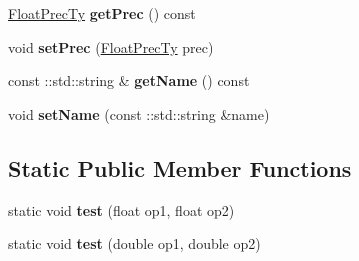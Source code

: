 \begin{DoxyCompactItemize}
\hyperlink{structfap_1_1FloatPrecTy}{Float\+Prec\+Ty} {\bfseries get\+Prec} () const
\item 
\hypertarget{classfap_1_1FloatingPointType_aad298748c031668ce198d5afefd81124}{}\label{classfap_1_1FloatingPointType_aad298748c031668ce198d5afefd81124} 
void {\bfseries set\+Prec} (\hyperlink{structfap_1_1FloatPrecTy}{Float\+Prec\+Ty} prec)
\item 
\hypertarget{classfap_1_1FloatingPointType_a086c6c9c7141b3b7e96e1cb2f4a9dacc}{}\label{classfap_1_1FloatingPointType_a086c6c9c7141b3b7e96e1cb2f4a9dacc} 
const \+::std\+::string \& {\bfseries get\+Name} () const
\item 
\hypertarget{classfap_1_1FloatingPointType_afc8aff9074cf27acd30777efd02c80e7}{}\label{classfap_1_1FloatingPointType_afc8aff9074cf27acd30777efd02c80e7} 
void {\bfseries set\+Name} (const \+::std\+::string \&name)
\end{DoxyCompactItemize}

\subsection*{Static Public Member Functions}
\begin{DoxyCompactItemize}
\item 
\hypertarget{classfap_1_1FloatingPointType_adf12cda398f2cc5af12e2fccb70df6a5}{}\label{classfap_1_1FloatingPointType_adf12cda398f2cc5af12e2fccb70df6a5} 
static void {\bfseries test} (float op1, float op2)
\item 
\hypertarget{classfap_1_1FloatingPointType_a7914d5f45474bee8fdaf2a3f33a70291}{}\label{classfap_1_1FloatingPointType_a7914d5f45474bee8fdaf2a3f33a70291} 
static void {\bfseries test} (double op1, double op2)
\end{DoxyCompactItemize}
